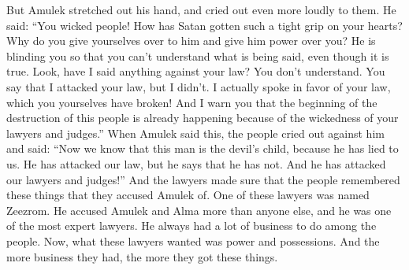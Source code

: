 But Amulek stretched out his hand, and cried out even more loudly to them. He said: ``You wicked people! How has Satan gotten such a tight grip on your hearts? Why do you give yourselves over to him and give him power over you? He is blinding you so that you can't understand what is being said, even though it is true.
\bverse \iffalse For behold, have I testified against your law? Ye do not understand; ye say that I have spoken against your law; but I have not, but I have spoken in favor of your law, to your condemnation. \fi
Look, have I said anything against your law? You don't understand. You say that I attacked your law, but I didn't. I actually spoke in favor of your law, which you yourselves have broken!
\bverse \iffalse And now behold, I say unto you, that the foundation of the destruction of this people is beginning to be laid by the unrighteousness of your lawyers and your judges. \fi
And I warn you that the beginning of the destruction of this people is already happening because of the wickedness of your lawyers and judges.''
\bverse \iffalse And now it came to pass that when Amulek had spoken these words the people cried out against him, saying: Now we know that this man is a child of the devil, for he hath lied unto us; for he hath spoken against our law. And now he says that he has not spoken against it. \fi
When Amulek said this, the people cried out against him and said: ``Now we know that this man is the devil's child, because he has lied to us. He has attacked our law, but he says that he has not.
\bverse \iffalse And again, he has reviled against our lawyers, and our judges. \fi
And he has attacked our lawyers and judges!''
\bverse \iffalse And it came to pass that the lawyers put it into their hearts that they should remember these things against him. \fi
And the lawyers made sure that the people remembered these things that they accused Amulek of.
\bverse \iffalse And there was one among them whose name was Zeezrom. Now he was the foremost to accuse Amulek and Alma, he being one of the most expert among them, having much business to do among the people. \fi
One of these lawyers was named Zeezrom. He accused Amulek and Alma more than anyone else, and he was one of the most expert lawyers. He always had a lot of business to do among the people.
\bverse \iffalse Now the object of these lawyers was to get gain; and they got gain according to their employ. \fi
Now, what these lawyers wanted was power and possessions. And the more business they had, the more they got these things.
